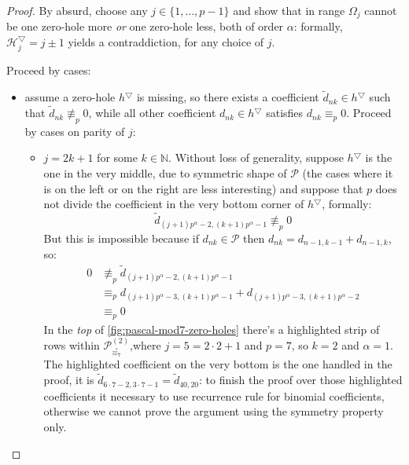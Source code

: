 \begin{proof}
    By absurd, choose any $j\in \lbrace 1, \ldots, p-1 \rbrace$ and show
    that in range $\Omega_{j}$ cannot be one zero-hole more \emph{or} one zero-hole less,
    both of order $\alpha$: formally, $\mathcal{H}_{j}^{\bigtriangledown}=j\pm1$ yields a contraddiction, 
    for any choice of $j$.

    Proceed by cases:
    \begin{itemize}
        \item assume a zero-hole $h^{\bigtriangledown}$ is missing, so there exists a coefficient
                $\tilde{d}_{nk}\in h^{\bigtriangledown}$ such that $\tilde{d}_{nk}\not\equiv_{p}0$, while all 
                other coefficient $d_{nk}\in h^{\bigtriangledown}$ satisfies $d_{nk} \equiv_{p}0$.
                Proceed by cases on parity of $j$:
            \begin{itemize}
                \item $j=2k+1$ for some $k\in\mathbb{N}$. Without loss of generality, suppose $h^{\bigtriangledown}$ is the one in the 
                very middle, due to symmetric shape of $\mathcal{P}$ (the cases where it is on the left or 
                on the right are less interesting) and
                suppose that $p$ does not divide the coefficient in the very bottom corner of $h^{\bigtriangledown}$, 
                formally:
                \begin{displaymath}
                    \tilde{d}_{(j+1) p^{\alpha} -2, (k+1)p^{\alpha} -1}\not\equiv_{p}0
                \end{displaymath}
                But this is impossible because if $d_{nk}\in \mathcal{P}$ 
                then $d_{nk} = d_{n-1,k-1} + d_{n-1, k}$, so:
                \begin{displaymath}
                    \begin{split}
                        0&\not\equiv_{p}\tilde{d}_{(j+1) p^{\alpha} -2, (k+1)p^{\alpha} -1} \\
                        &\equiv_{p} d_{(j+1) p^{\alpha} -3, (k+1)p^{\alpha} -1} + d_{(j+1) p^{\alpha} -3, (k+1)p^{\alpha}-2 }\\
                        &\equiv_{p}0
                    \end{split}
                \end{displaymath}
                In the \emph{top} of \autoref{fig:pascal-mod7-zero-holes} there's a highlighted strip of rows 
                within $\mathcal{P}_{\stackrel{\circ}{\equiv_{7}}}^{(2)}$,where $j=5=2\cdot2+1$ and $p=7$, so $k=2$
                and $\alpha=1$.
                The highlighted coefficient on the very bottom is the one handled in the proof, it is 
                $\tilde{d}_{6\cdot 7-2, 3\cdot 7 -1}=\tilde{d}_{40, 20}$: to finish the proof over 
                those highlighted coefficients it necessary to use recurrence rule for binomial coefficients,
                otherwise we cannot prove the argument using the symmetry property only. 


\end{itemize}
\end{itemize}
\end{proof}
